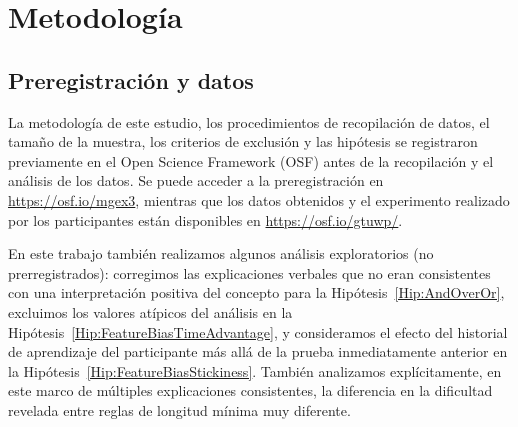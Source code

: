 \section{Metodología}\label{Sec:AdditionalMethodology}


\subsection{Preregistración y datos}

La metodología de este estudio, los procedimientos de recopilación de datos, el tamaño de la muestra, los criterios de exclusión y las hipótesis se registraron previamente en el Open Science Framework (OSF) antes de la recopilación y el análisis de los datos. Se puede acceder a la preregistración en \url{https://osf.io/mgex3}, mientras que los datos obtenidos y el experimento realizado por los participantes están disponibles en \url{https://osf.io/gtuwp/}.

En este trabajo también realizamos algunos análisis exploratorios (no prerregistrados): corregimos las explicaciones verbales que no eran consistentes con una interpretación positiva del concepto para la Hipótesis~\ref{Hip:AndOverOr}, excluimos los valores atípicos del análisis en la Hipótesis~\ref{Hip:FeatureBiasTimeAdvantage}, y consideramos el efecto del historial de aprendizaje del participante más allá de la prueba inmediatamente anterior en la Hipótesis~\ref{Hip:FeatureBiasStickiness}. También analizamos explícitamente, en este marco de múltiples explicaciones consistentes, la diferencia en la dificultad revelada entre reglas de longitud mínima muy diferente.

